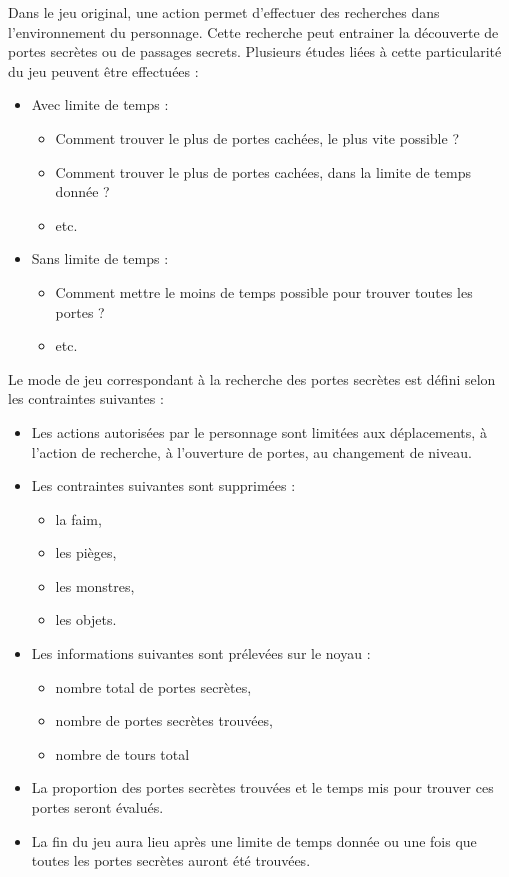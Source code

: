 \documentclass[12pt]{article}
\begin{document}
Dans le jeu original, une action permet d'effectuer des recherches dans l'environnement du personnage. Cette recherche peut entrainer la découverte de portes secrètes ou de passages secrets. Plusieurs études liées à cette particularité du jeu peuvent être effectuées : 
\begin{itemize}
	\item Avec limite de temps : 
	\begin{itemize}
		\item Comment trouver le plus de portes cachées, le plus vite possible ? 
		\item Comment trouver le plus de portes cachées, dans la limite de temps donnée ? 
		\item etc. 
	\end{itemize}
	\item Sans limite de temps : 
	\begin{itemize}
		\item Comment mettre le moins de temps possible pour trouver toutes les portes ? 
		\item etc.
	\end{itemize}
\end{itemize}

Le mode de jeu correspondant à la recherche des portes secrètes est défini selon les contraintes suivantes : 
\begin{itemize}
	\item Les actions autorisées par le personnage sont limitées aux déplacements, à l'action de recherche, à l'ouverture de portes, au changement de niveau. 
	\item Les contraintes suivantes sont supprimées : 
	\begin{itemize}
		\item la faim, 
		\item les pièges, 
		\item les monstres, 
		\item les objets. 
	\end{itemize}
	\item Les informations suivantes sont prélevées sur le noyau :
	\begin{itemize}
		\item nombre total de portes secrètes, 
		\item nombre de portes secrètes trouvées, 
		\item nombre de tours total 
	\end{itemize}
	\item La proportion des portes secrètes trouvées et le temps mis pour trouver ces portes seront évalués. 
	\item La fin du jeu aura lieu après une limite de temps donnée ou une fois que toutes les portes secrètes auront été trouvées.
\end{itemize}
\end{document}

